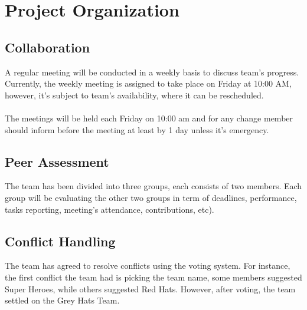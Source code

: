 \documentclass{article}
\begin{document}
\section{Project Organization}
\subsection{Collaboration}
A regular meeting will be conducted in a weekly basis to discuss team's progress. Currently, the weekly meeting is assigned to take place on Friday at 10:00 AM, however, it's subject to team's availability, where it can be rescheduled. \\\\
\noindent The meetings will be held each Friday on 10:00 am and for any change member should inform before the meeting at least by 1 day unless it's emergency.

\subsection{Peer Assessment}
The team has been divided into three groups, each consists of two members. Each group will be evaluating the other two groups in term of deadlines, performance, tasks reporting, meeting's attendance, contributions, etc).

\subsection{Conflict Handling}
The team has agreed to resolve conflicts using the voting system. For instance, the first conflict the team had is picking the team name, some members suggested Super Heroes, while others suggested Red Hats. However, after voting, the team settled on the Grey Hats Team.
\end{document}
